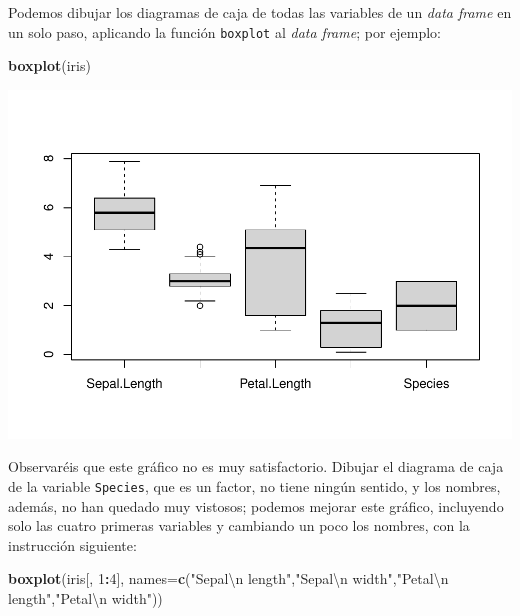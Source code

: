 \documentclass[
]{book}
\newenvironment{Shaded}{\begin{snugshade}}{\end{snugshade}}
\newcommand{\CharTok}[1]{\textcolor[rgb]{0.31,0.60,0.02}{#1}}
\newcommand{\DataTypeTok}[1]{\textcolor[rgb]{0.13,0.29,0.53}{#1}}
\newcommand{\DecValTok}[1]{\textcolor[rgb]{0.00,0.00,0.81}{#1}}
\newcommand{\KeywordTok}[1]{\textcolor[rgb]{0.13,0.29,0.53}{\textbf{#1}}}
\newcommand{\NormalTok}[1]{#1}
\newcommand{\OperatorTok}[1]{\textcolor[rgb]{0.81,0.36,0.00}{\textbf{#1}}}
\newcommand{\StringTok}[1]{\textcolor[rgb]{0.31,0.60,0.02}{#1}}
\theoremstyle{definition}
\theoremstyle{definition}
\theoremstyle{definition}
\theoremstyle{remark}
\begin{document}
Podemos dibujar los diagramas de caja de todas las variables de un \emph{data frame} en un solo paso, aplicando la función \texttt{boxplot} al \emph{data frame}; por ejemplo:

\begin{Shaded}
\begin{Highlighting}[]
\KeywordTok{boxplot}\NormalTok{(iris)}
\end{Highlighting}
\end{Shaded}

\begin{center}\includegraphics[width=0.9\linewidth]{12chap12_Descripcion_cuantitativos_files/figure-latex/unnamed-chunk-45-1} \end{center}

Observaréis que este gráfico no es muy satisfactorio. Dibujar el diagrama de caja de la variable \texttt{Species}, que es un factor, no tiene ningún sentido, y los nombres, además, no han quedado muy vistosos; podemos mejorar este gráfico, incluyendo solo las cuatro primeras variables y cambiando un poco los nombres, con la instrucción siguiente:

\begin{Shaded}
\begin{Highlighting}[]
\KeywordTok{boxplot}\NormalTok{(iris[, }\DecValTok{1}\OperatorTok{:}\DecValTok{4}\NormalTok{], }\DataTypeTok{names=}\KeywordTok{c}\NormalTok{(}\StringTok{"Sepal}\CharTok{\textbackslash{}n}\StringTok{ length"}\NormalTok{,}\StringTok{"Sepal}\CharTok{\textbackslash{}n}\StringTok{ width"}\NormalTok{,}\StringTok{"Petal}\CharTok{\textbackslash{}n}\StringTok{ length"}\NormalTok{,}\StringTok{"Petal}\CharTok{\textbackslash{}n}\StringTok{ width"}\NormalTok{))}
\end{Highlighting}
\end{Shaded}
\end{document}
